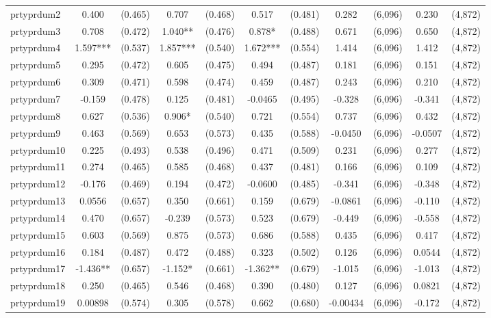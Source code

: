 \documentclass[]{article}
\begin{document}
\begin{tabular}{lcccccccccc}
prtyprdum2 & 0.400 & (0.465) & 0.707 & (0.468) & 0.517 & (0.481) & 0.282 & (6,096) & 0.230 & (4,872) \\
prtyprdum3 & 0.708 & (0.472) & 1.040** & (0.476) & 0.878* & (0.488) & 0.671 & (6,096) & 0.650 & (4,872) \\
prtyprdum4 & 1.597*** & (0.537) & 1.857*** & (0.540) & 1.672*** & (0.554) & 1.414 & (6,096) & 1.412 & (4,872) \\
prtyprdum5 & 0.295 & (0.472) & 0.605 & (0.475) & 0.494 & (0.487) & 0.181 & (6,096) & 0.151 & (4,872) \\
prtyprdum6 & 0.309 & (0.471) & 0.598 & (0.474) & 0.459 & (0.487) & 0.243 & (6,096) & 0.210 & (4,872) \\
prtyprdum7 & -0.159 & (0.478) & 0.125 & (0.481) & -0.0465 & (0.495) & -0.328 & (6,096) & -0.341 & (4,872) \\
prtyprdum8 & 0.627 & (0.536) & 0.906* & (0.540) & 0.721 & (0.554) & 0.737 & (6,096) & 0.432 & (4,872) \\
prtyprdum9 & 0.463 & (0.569) & 0.653 & (0.573) & 0.435 & (0.588) & -0.0450 & (6,096) & -0.0507 & (4,872) \\
prtyprdum10 & 0.225 & (0.493) & 0.538 & (0.496) & 0.471 & (0.509) & 0.231 & (6,096) & 0.277 & (4,872) \\
prtyprdum11 & 0.274 & (0.465) & 0.585 & (0.468) & 0.437 & (0.481) & 0.166 & (6,096) & 0.109 & (4,872) \\
prtyprdum12 & -0.176 & (0.469) & 0.194 & (0.472) & -0.0600 & (0.485) & -0.341 & (6,096) & -0.348 & (4,872) \\
prtyprdum13 & 0.0556 & (0.657) & 0.350 & (0.661) & 0.159 & (0.679) & -0.0861 & (6,096) & -0.110 & (4,872) \\
prtyprdum14 & 0.470 & (0.657) & -0.239 & (0.573) & 0.523 & (0.679) & -0.449 & (6,096) & -0.558 & (4,872) \\
prtyprdum15 & 0.603 & (0.569) & 0.875 & (0.573) & 0.686 & (0.588) & 0.435 & (6,096) & 0.417 & (4,872) \\
prtyprdum16 & 0.184 & (0.487) & 0.472 & (0.488) & 0.323 & (0.502) & 0.126 & (6,096) & 0.0544 & (4,872) \\
prtyprdum17 & -1.436** & (0.657) & -1.152* & (0.661) & -1.362** & (0.679) & -1.015 & (6,096) & -1.013 & (4,872) \\
prtyprdum18 & 0.250 & (0.465) & 0.546 & (0.468) & 0.390 & (0.480) & 0.127 & (6,096) & 0.0821 & (4,872) \\
prtyprdum19 & 0.00898 & (0.574) & 0.305 & (0.578) & 0.662 & (0.680) & -0.00434 & (6,096) & -0.172 & (4,872) \\

\end{tabular}
\end{document}
